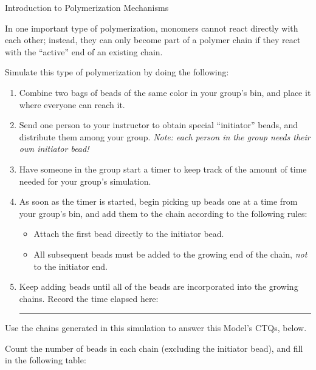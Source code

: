 \begin{activity}{Introduction to Polymerization Mechanisms}
\begin{model}
	In one important type of polymerization, monomers cannot react directly with each other; instead, they can only become part of a polymer chain if they react with the ``active'' end of an existing chain.
	
	Simulate this type of polymerization by doing the following:
	\begin{enumerate}
		\item Combine two bags of beads of the same color in your group's bin, and place it where everyone can reach it.
		\item Send one person to your instructor to obtain special ``initiator'' beads, and distribute them among your group. \emph{Note: each person in the group needs their own initiator bead!}
		\item Have someone in the group start a timer to keep track of the amount of time needed for your group's simulation.
		\item As soon as the timer is started, begin picking up beads one at a time from your group's bin, and add them to the chain according to the following rules:
			\begin{itemize}
				\item Attach the first bead directly to the initiator bead.
				\item All subsequent beads must be added to the growing end of the chain, \emph{not} to the initiator end.
			\end{itemize}
		\item Keep adding beads until all of the beads are incorporated into the growing chains.  Record the time elapsed here: \rule{1in}{0.15mm}
	\end{enumerate}
	
	Use the chains generated in this simulation to answer this Model's CTQs, below.

\end{model}

\vspace{0.05in}
\begin{ctqs}

	\question Count the number of beads in each chain (excluding the initiator bead), and fill in the following table: \label{\labelbase:ctq:numbeadschain}
		

\end{ctqs}
\end{activity}
